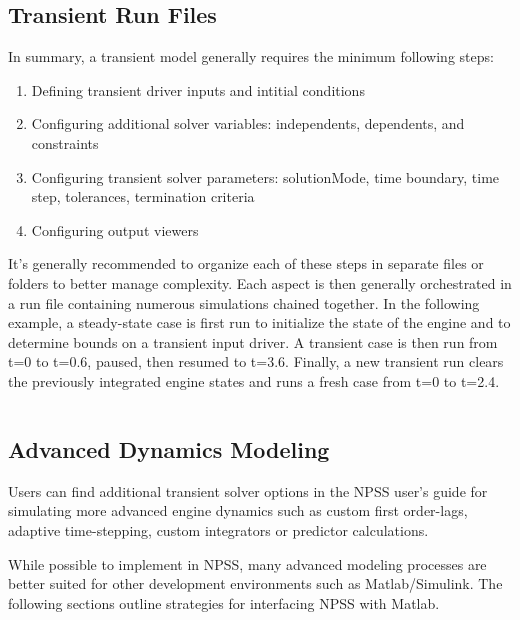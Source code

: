 \documentclass[heading.tex]{subfiles}
\begin{document}
 \begin{adjustwidth}{-1cm}{-1cm}
 \inputminted[]{c++}{code/transient1}
 \end{adjustwidth} 

\subsection{Transient Run Files}

In summary, a transient model generally requires the minimum following steps:

\begin{enumerate}
\item Defining transient driver inputs and intitial conditions
\item Configuring additional solver variables: independents, dependents, and constraints
\item Configuring transient solver parameters: solutionMode, time boundary, time step, tolerances, termination criteria
\item Configuring output viewers
\end{enumerate}

It's generally recommended to organize each of these steps in separate files or folders to better manage complexity.
Each aspect is then generally orchestrated in a run file containing numerous simulations chained together. 
In the following example, a steady-state case is first run to initialize the state of the engine and
to determine bounds on a transient input driver.
A transient case is then run from t=0 to t=0.6, paused, then resumed to t=3.6.
Finally, a new transient run clears the previously integrated engine states and runs a fresh case from t=0 to t=2.4.

 \begin{adjustwidth}{1cm}{-1cm}
 \inputminted[]{c++}{code/transientRun}
 \end{adjustwidth} 

\subsection{Advanced Dynamics Modeling}

Users can find additional transient solver options in the NPSS user's guide \cite[chap.~18]{NPSS} for simulating
more advanced engine dynamics such as custom first order-lags, adaptive time-stepping, custom integrators or
predictor calculations.

While possible to implement in NPSS, many advanced modeling processes are better suited
for other development environments such as Matlab/Simulink.
The following sections outline strategies for interfacing NPSS with Matlab.
\end{document}
